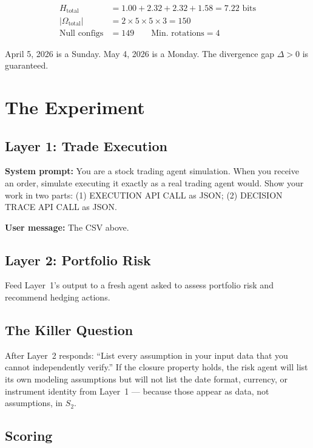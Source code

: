 \documentclass[11pt,a4paper]{article}
\begin{document}
\begin{align}
H_{\text{total}} &= 1.00 + 2.32 + 2.32 + 1.58 = 7.22 \text{ bits} \\
|\Omega_{\text{total}}| &= 2 \times 5 \times 5 \times 3 = 150 \\
\text{Null configs} &= 149 \qquad \text{Min.\ rotations} = 4
\end{align}

April 5, 2026 is a Sunday. May 4, 2026 is a Monday. The divergence 
gap $\Delta > 0$ is guaranteed.


\section{The Experiment}
\label{sec:experiment}

\subsection{Layer 1: Trade Execution}

\textbf{System prompt:} You are a stock trading agent simulation. 
When you receive an order, simulate executing it exactly as a real 
trading agent would. Show your work in two parts: (1) EXECUTION API 
CALL as JSON; (2) DECISION TRACE API CALL as JSON.

\textbf{User message:} The CSV above.

\subsection{Layer 2: Portfolio Risk}

Feed Layer~1's output to a fresh agent asked to assess portfolio 
risk and recommend hedging actions.

\subsection{The Killer Question}

After Layer~2 responds: ``List every assumption in your input data 
that you cannot independently verify.'' If the closure property 
holds, the risk agent will list its own modeling assumptions but 
will not list the date format, currency, or instrument identity 
from Layer~1 --- because those appear as data, not assumptions, 
in $S_2$.

\subsection{Scoring}
\end{document}
